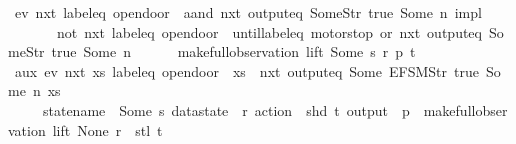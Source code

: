 \begin{isabellebody}
\ {\isachardoublequoteopen}{\isacharparenleft}{\isacharparenleft}ev\ {\isacharparenleft}nxt\ {\isacharparenleft}{\isacharparenleft}label{\isacharunderscore}eq\ {\isacharprime}{\isacharprime}opendoor\ {\isacharprime}{\isacharprime}{\isacharparenright}\ aand\ {\isacharparenleft}nxt\ {\isacharparenleft}output{\isacharunderscore}eq\ {\isacharbrackleft}Some{\isacharparenleft}Str\ {\isacharprime}{\isacharprime}true{\isacharprime}{\isacharprime}{\isacharparenright}{\isacharcomma}\ Some\ n{\isacharbrackright}{\isacharparenright}{\isacharparenright}{\isacharparenright}{\isacharparenright}{\isacharparenright}\ impl\isanewline
\ \ \ \ \ \ \ {\isacharparenleft}{\isacharparenleft}not\ {\isacharparenleft}nxt\ {\isacharparenleft}label{\isacharunderscore}eq\ {\isacharprime}{\isacharprime}opendoor\ {\isacharprime}{\isacharprime}{\isacharparenright}{\isacharparenright}{\isacharparenright}\ until{\isacharparenleft}{\isacharparenleft}{\isacharparenleft}label{\isacharunderscore}eq\ {\isacharprime}{\isacharprime}motorstop{\isacharprime}{\isacharprime}{\isacharparenright}\ or\ {\isacharparenleft}nxt\ {\isacharparenleft}output{\isacharunderscore}eq\ {\isacharbrackleft}Some{\isacharparenleft}Str\ {\isacharprime}{\isacharprime}true{\isacharprime}{\isacharprime}{\isacharparenright}{\isacharcomma}\ Some\ n{\isacharbrackright}{\isacharparenright}{\isacharparenright}{\isacharparenright}{\isacharparenright}{\isacharparenright}{\isacharparenright}\isanewline
\ \ \ \ \ \ {\isacharparenleft}make{\isacharunderscore}full{\isacharunderscore}observation\ lift\ {\isacharparenleft}Some\ s{\isacharparenright}\ r\ p\ t{\isacharparenright}{\isachardoublequoteclose}\isanewline
%
\isadelimproof
%
\endisadelimproof
%
\isatagproof
{}\isamarkupfalse%
{\isacharminus}\isanewline
\ \ \isamarkupfalse%
\ aux{\isacharcolon}\ {\isachardoublequoteopen}{\isasymnot}ev\ {\isacharparenleft}nxt\ {\isacharparenleft}{\isasymlambda}xs{\isachardot}\ label{\isacharunderscore}eq\ {\isacharprime}{\isacharprime}opendoor\ {\isacharprime}{\isacharprime}\ xs\ {\isasymand}\ nxt\ {\isacharparenleft}output{\isacharunderscore}eq\ {\isacharbrackleft}Some\ {\isacharparenleft}EFSM{\isachardot}Str\ {\isacharprime}{\isacharprime}true{\isacharprime}{\isacharprime}{\isacharparenright}{\isacharcomma}\ Some\ n{\isacharbrackright}{\isacharparenright}\ xs{\isacharparenright}{\isacharparenright}\isanewline
\ \ \ \ \ {\isacharparenleft}{\isasymlparr}statename\ {\isacharequal}\ Some\ s{\isacharcomma}\ datastate\ {\isacharequal}\ r{\isacharcomma}\ action\ {\isacharequal}\ shd\ t{\isacharcomma}\ output\ {\isacharequal}\ p{\isasymrparr}\ {\isacharhash}{\isacharhash}\ make{\isacharunderscore}full{\isacharunderscore}observation\ lift\ None\ r\ {\isacharbrackleft}{\isacharbrackright}\ {\isacharparenleft}stl\ t{\isacharparenright}{\isacharparenright}{\isachardoublequoteclose}\isanewline

\end{isabellebody}
